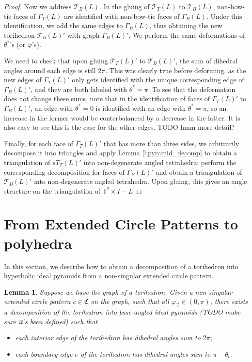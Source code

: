 \documentclass[11pt]{amsart}
\newcommand{\lemref}[1]{Lemma \ref{#1}}
\newcommand{\torus}{{\mathbb{T}^2}}
\newcommand{\sT}{{\mathcal{T}}}
\newcommand{\CCC}{{\underline{\mathfrak{C}}}}
\newcommand{\vphi}{\varphi}
\newcommand{\toruscomp}[1]{{\torus \times I - #1}}
\theoremstyle{plain}
\newtheorem{lemma}[theorem]{Lemma}
\theoremstyle{definition}
\begin{document}
\begin{proof}
Now we address $\sT_B(L)$.
In the gluing of $\sT_T(L)$ to $\sT_B(L)$,
non-bow-tie faces of $\Gamma_T(L)$ are identified with
non-bow-tie faces of $\Gamma_B(L)$.
Under this identification, we add the same edges to $\Gamma_B(L)$,
thus obtaining the new torihedron $\sT_B(L)'$ with graph
$\Gamma_B(L)'$.
We perform the same deformations of $\theta^*$'s (or $\vphi$'s).


We need to check that upon gluing $\sT_T(L)'$ to $\sT_B(L)'$,
the sum of dihedral angles around each edge is still $2\pi$.
This was clearly true before deforming, as the new edges of
$\Gamma_T(L)'$ only gets identified with the unique
corresponding edge of $\Gamma_B(L)'$, and they are both labeled
with $\theta^* = \pi$.
To see that the deformation does not change these sums,
note that in the identification of faces of $\Gamma_T(L)'$
to $\Gamma_B(L)'$,
an edge with $\theta^*=0$ is identified with an edge with
$\theta^*=\pi$,
so an increase in the former would be conterbalanced by
a decrease in the latter.
It is also easy to see this is the case for the other edges.
TODO hmm more detail?


Finally, for each face of $\Gamma_T(L)'$ that has more than three sides,
we arbitrarily decompose it into triangles
and apply \lemref{l:pyramid_decomp}
to obtain a triangulation of $sT_T(L)'$ into non-degenerate angled tetrahedra;
perform the corresponding decomposition for faces of
$\Gamma_B(L)'$ and obtain a triangulation of $\sT_B(L)'$
into non-degenerate angled tetrahedra.
Upon gluing, this gives an angle structure on the triangulation
of $\toruscomp{L}$
\end{proof}





\section{From Extended Circle Patterns to polyhedra}

In this section, we describe how to obtain a
decomposition of a torihedron
into hyperbolic ideal pyramids
from a non-singular extended circle pattern.

\begin{lemma}
\label{l:circpattern_polyhedra}
Suppose we have the graph of a torihedron.
Given a non-singular extended circle pattern $c \in \CCC$ on the graph,
such that all $\vphi_{\vec{e}} \in (0,\pi)$,
there exists a decomposition of the torihedron
into base-angled ideal pyramids (TODO make sure it's been defined) such that
	\begin{itemize}
		\item each interior edge of the torihedron has dihedral angles sum to $2\pi$;
		\item each boundary edge $e$ of the torihedron has dihedral angles sum to
			$\pi - \theta_e$.
	\end{itemize}
\end{lemma}
\end{document}
